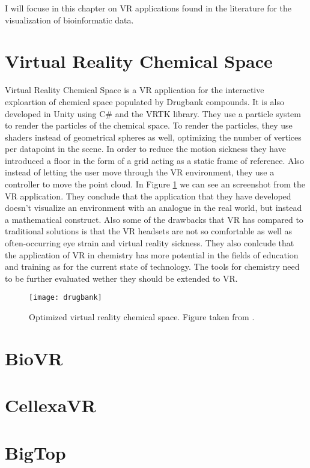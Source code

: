 I will focuse in this chapter on VR applications found in the literature for the visualization of bioinformatic data.

\section{Virtual Reality Chemical Space}
Virtual Reality Chemical Space is a VR application for the interactive exploartion of chemical space populated by Drugbank compounds\cite{drugbank}. It is also developed in Unity using C\# and the VRTK library. They use a particle system to render the particles of the chemical space. To render the particles, they use shaders instead of geometrical spheres as well, optimizing the number of vertices per datapoint in the scene. In order to reduce the motion sickness they have introduced a floor in the form of a grid acting as a static frame of reference. Also instead of letting the user move through the VR environment, they use a controller to move the point cloud. In Figure \ref{fig:drugbank} we can see an screenshot from the VR application. They conclude that the application that they have developed doesn't visualize an environment with an analogue in the real world, but instead a mathematical construct. Also some of the drawbacks that VR has compared to traditional solutions is that the VR headsets are not so comfortable as well as often-occurring eye strain and virtual reality sickness. They also conlcude that the application of VR in chemistry has more potential in the fields of education and training as for the current state of technology. The tools for chemistry need to be further evaluated wether they should be extended to VR.

\begin{figure}[h!]
    \centering%
    \texttt{[image: drugbank]}
    \caption{Optimized virtual reality chemical space. Figure taken from \cite{drugbank}.}
    \label{fig:drugbank}
\end{figure}%

\section{BioVR}

\section{CellexaVR}

\section{BigTop}

